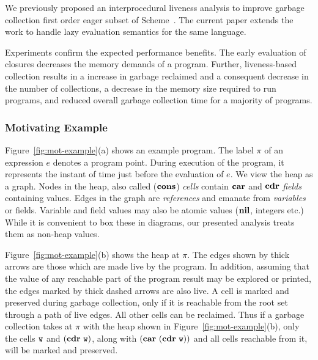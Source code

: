 We previously proposed an interprocedural liveness analysis to improve
garbage collection first order eager subset of Scheme~\cite{cc-paper}.
The current paper extends the work to handle lazy evaluation semantics
for the same language.

Experiments  confirm  the  expected  performance benefits.  The  early
evaluation   of   closures  decreases   the   memory   demands  of   a
program. Further,  liveness-based collection results in  a increase in
garbage  reclaimed  and  a   consequent  decrease  in  the  number  of
collections, a decrease  in the memory size required  to run programs,
and  reduced  overall  garbage  collection  time  for  a  majority  of
programs.



\subsubsection{Motivating Example}
\label{sec:motiv}

Figure~\ref{fig:mot-example}(a) shows  an example program.   The label
$\pi$ of an expression $e$  denotes a program point.  During execution
of  the program, it  represents the  instant of  time just  before the
evaluation  of  $e$.  
We  view the  heap  as a graph.  
Nodes in the heap, also  called  ($\mbox{$\mathbf{cons}$}$) {\em  cells\/} contain $\mbox{$\mathbf{car}$}$ and $\mbox{$\mathbf{cdr}$}$ {\em fields}
containing values.  Edges in the graph are {\em references} and
emanate from {\em variables} or fields.
Variable and field values may also be atomic values ($\mbox{$\mathbf{ nil}$}$, integers etc.)
While it is convenient to box these in diagrams, our presented
analysis treats them as non-heap values.

Figure~\ref{fig:mot-example}(b)  shows the heap at $\pi$.
The edges shown  by thick arrows are those  which are made live by the
program. In addition,  assuming that
the value of any reachable part of the program result may be explored
or printed, the edges marked by thick dashed arrows are also live.
A cell  is  marked and preserved  during  garbage collection,  only  if it  is
reachable from the  root set through a path of  live edges.  All other
cells can be  reclaimed.  Thus if  a garbage collection takes
at $\pi$ with the    heap   shown   in
Figure~\ref{fig:mot-example}(b), only the cells $\mbox{\tt w}$ and $(\mbox{$\mathbf{cdr}$}~ \mbox{\tt w})$, along with $(\mbox{$\mathbf{car}$}~(\mbox{$\mathbf{cdr}$}~\mbox{\tt w}))$ and all cells reachable from it,
will be marked and preserved.



